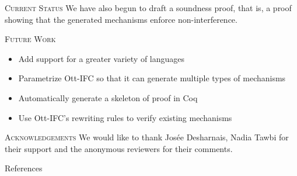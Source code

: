 \documentclass[final]{beamer}
\newlength{\onecolwid}
\begin{document}
\begin{frame}[fragile]
\begin{columns}[t]
\begin{column}{\onecolwid}
\begin{block}{\textsc{Current Status}}
We have also begun to draft a soundness proof, that is, a proof showing that the generated mechanisms enforce non-interference.


\end{block}

\begin{block}{\textsc{Future Work}}
    \begin{itemize}
        \item Add support for a greater variety of languages
        \item Parametrize Ott-IFC so that it can generate multiple types of mechanisms
        \item Automatically generate a skeleton of proof in Coq
        \item Use Ott-IFC's rewriting rules to verify existing mechanisms
    \end{itemize}
\end{block}

\begin{block}{\textsc{Acknowledgements}}
    We would like to thank Josée Desharnais, Nadia Tawbi for their support and the anonymous reviewers for their comments.    
\end{block}

\begin{block}{References}
    
    
\end{block}
\end{column}
\end{columns}
\end{frame}
\end{document}
